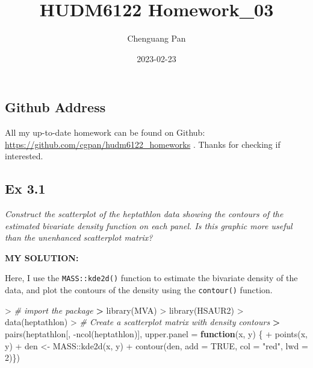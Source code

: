 \documentclass[
]{article}
\title{HUDM6122 Homework\_03}
\author{Chenguang Pan}
\date{2023-02-23}
\newenvironment{Shaded}{\begin{snugshade}}{\end{snugshade}}
\newcommand{\AttributeTok}[1]{\textcolor[rgb]{0.77,0.63,0.00}{#1}}
\newcommand{\CommentTok}[1]{\textcolor[rgb]{0.56,0.35,0.01}{\textit{#1}}}
\newcommand{\ConstantTok}[1]{\textcolor[rgb]{0.00,0.00,0.00}{#1}}
\newcommand{\ControlFlowTok}[1]{\textcolor[rgb]{0.13,0.29,0.53}{\textbf{#1}}}
\newcommand{\DecValTok}[1]{\textcolor[rgb]{0.00,0.00,0.81}{#1}}
\newcommand{\ErrorTok}[1]{\textcolor[rgb]{0.64,0.00,0.00}{\textbf{#1}}}
\newcommand{\FunctionTok}[1]{\textcolor[rgb]{0.00,0.00,0.00}{#1}}
\newcommand{\NormalTok}[1]{#1}
\newcommand{\OtherTok}[1]{\textcolor[rgb]{0.56,0.35,0.01}{#1}}
\newcommand{\SpecialCharTok}[1]{\textcolor[rgb]{0.00,0.00,0.00}{#1}}
\newcommand{\StringTok}[1]{\textcolor[rgb]{0.31,0.60,0.02}{#1}}
\begin{document}
\maketitle

\hypertarget{github-address}{%
\subsection{Github Address}\label{github-address}}

All my up-to-date homework can be found on Github:
\url{https://github.com/cgpan/hudm6122_homeworks} . Thanks for checking
if interested.

\hypertarget{ex-3.1}{%
\subsection{Ex 3.1}\label{ex-3.1}}

\emph{Construct the scatterplot of the heptathlon data showing the
contours of the estimated bivariate density function on each panel. Is
this graphic more useful than the unenhanced scatterplot matrix?}

\textbf{MY SOLUTION:}

Here, I use the \texttt{MASS::kde2d()} function to estimate the
bivariate density of the data, and plot the contours of the density
using the \texttt{contour()} function.

\begin{Shaded}
\begin{Highlighting}[]
\SpecialCharTok{\textgreater{}} \CommentTok{\# import the package}
\ErrorTok{\textgreater{}} \FunctionTok{library}\NormalTok{(MVA)}
\SpecialCharTok{\textgreater{}} \FunctionTok{library}\NormalTok{(HSAUR2)}
\SpecialCharTok{\textgreater{}} \FunctionTok{data}\NormalTok{(heptathlon)}
\SpecialCharTok{\textgreater{}} \CommentTok{\# Create a scatterplot matrix with density contours}
\ErrorTok{\textgreater{}} \FunctionTok{pairs}\NormalTok{(heptathlon[, }\SpecialCharTok{{-}}\FunctionTok{ncol}\NormalTok{(heptathlon)], }\AttributeTok{upper.panel =} \ControlFlowTok{function}\NormalTok{(x, y) \{}
\SpecialCharTok{+}   \FunctionTok{points}\NormalTok{(x, y)}
\SpecialCharTok{+}\NormalTok{   den }\OtherTok{\textless{}{-}}\NormalTok{ MASS}\SpecialCharTok{::}\FunctionTok{kde2d}\NormalTok{(x, y)}
\SpecialCharTok{+}   \FunctionTok{contour}\NormalTok{(den, }\AttributeTok{add =} \ConstantTok{TRUE}\NormalTok{, }\AttributeTok{col =} \StringTok{"red"}\NormalTok{, }\AttributeTok{lwd =} \DecValTok{2}\NormalTok{)\})}
\end{Highlighting}
\end{Shaded}
\end{document}
